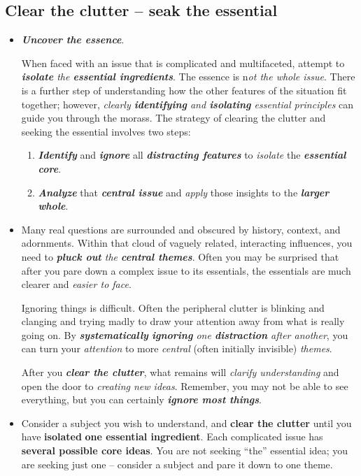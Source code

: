 \documentclass[11pt]{article}
\begin{document}
\subsection{Clear the clutter -- seak the essential}
\begin{itemize}
\item \emph{\textbf{Uncover the essence}}. 

When faced with an issue that is complicated and multifaceted, attempt to \emph{\textbf{isolate} the \textbf{essential ingredients}}. The essence is n\emph{ot the whole issue}. There is a further step of understanding how the other features of the situation fit together; however, \emph{clearly \textbf{identifying} and \textbf{isolating} essential principles} can guide you through the morass. The strategy of
clearing the clutter and seeking the essential involves two steps:
\begin{enumerate}
\item \textbf{\emph{Identify}} and \emph{\textbf{ignore}} all \emph{\textbf{distracting features}} to \emph{isolate} the \emph{\textbf{essential core}}.
\item  \emph{\textbf{Analyze}} that \emph{\textbf{central issue}} and \emph{apply} those insights to the \emph{\textbf{larger whole}}.
\end{enumerate}

\item Many real questions are surrounded and obscured by history, context, and adornments. Within that cloud of vaguely related, interacting influences, you need to \emph{\textbf{pluck out} the \textbf{central themes}}.  Often you may be surprised that after you pare down a complex issue to its essentials, the essentials are much clearer and \emph{easier to face}. 

Ignoring things is difficult. Often the peripheral clutter is blinking and clanging and trying madly to draw your attention away from what is really going on. By \emph{\textbf{systematically} \textbf{ignoring} one \textbf{distraction} after another}, you can turn your \emph{attention} to more \emph{central} (often initially invisible) \emph{themes}. 

After you \emph{\textbf{clear the clutter}}, what remains will \emph{clarify understanding} and open the door to \emph{creating new ideas}. Remember, you may not be able to see everything, but you can certainly \emph{\textbf{ignore most things}}.


\item \begin{exercise}
Consider a subject you wish to understand, and \textbf{clear the clutter} until you have \textbf{isolated} \textbf{one essential ingredient}. Each complicated issue has \textbf{several possible core ideas}. You are not seeking ``the” essential idea; you are seeking just one -- consider a subject and pare it down to one theme. 


\end{exercise}
\end{itemize}
\end{document}
